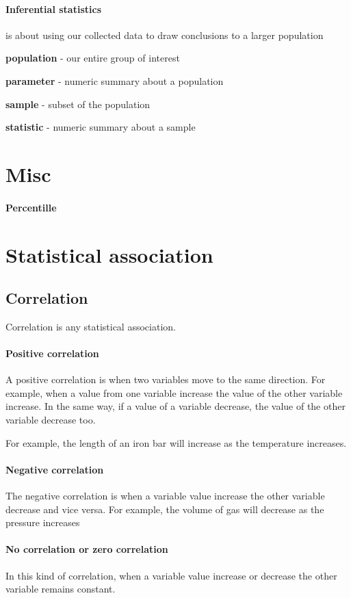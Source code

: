 \documentclass[]{article}
\begin{document}
\paragraph{Inferential statistics} is about using our collected data to draw conclusions to a larger population

\begin{list}{}{}
	\item \textbf{population} - our entire group of interest
	\item \textbf{parameter} - numeric summary about a population
	\item \textbf{sample} - subset of the population
	\item \textbf{statistic} - numeric summary about a sample
\end{list}
\section{Misc}

\paragraph{Percentille}

\section{Statistical association}

\subsection{Correlation}

Correlation is any statistical association.

\paragraph{Positive correlation}
A positive correlation is when two variables move to the same direction. For example, when a value from 
one variable increase the value of the other variable increase. In the same way, if a value of a variable
decrease, the value of the other variable decrease too.

For example, the length of an iron bar will increase as the temperature increases.

\paragraph{Negative correlation}
The negative correlation is when a variable value increase the other variable decrease and vice versa. 
For example, the volume of gas will decrease as the pressure increases

\paragraph{No correlation or zero correlation}
In this kind of correlation, when a variable value increase or decrease the other variable remains constant.


\end{document}
